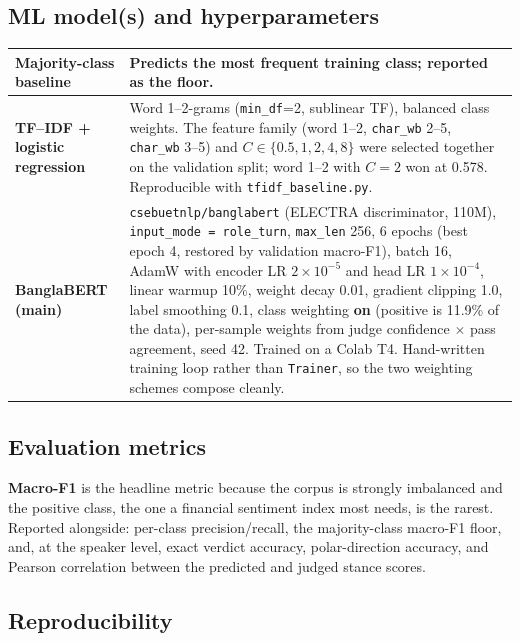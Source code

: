\documentclass[11pt,a4paper]{article}
\newcommand{\thd}[1]{\textbf{\sffamily\small #1}}          %
\begin{document}
\subsection{ML model(s) and hyperparameters}

\begin{tabularx}{\textwidth}{|L{4.0cm}|Y|}
\hline
\thd{Majority-class baseline} & Predicts the most frequent training class; reported as the floor. \\ \hline
\thd{TF--IDF + logistic regression} & Word 1--2-grams (\texttt{min\_df}=2, sublinear TF), balanced class weights. The feature family (word 1--2, \texttt{char\_wb} 2--5, \texttt{char\_wb} 3--5) and $C\in\{0.5,1,2,4,8\}$ were selected together on the validation split; word 1--2 with $C=2$ won at 0.578. Reproducible with \texttt{tfidf\_baseline.py}. \\ \hline
\thd{BanglaBERT (main)} & \texttt{csebuetnlp/banglabert} (ELECTRA discriminator, 110M), \texttt{input\_mode = role\_turn}, \texttt{max\_len} 256, 6 epochs (best epoch 4, restored by validation macro-F1), batch 16, AdamW with encoder LR $2\times10^{-5}$ and head LR $1\times10^{-4}$, linear warmup 10\%, weight decay 0.01, gradient clipping 1.0, label smoothing 0.1, class weighting \textbf{on} (positive is 11.9\% of the data), per-sample weights from judge confidence $\times$ pass agreement, seed 42. Trained on a Colab T4. Hand-written training loop rather than \texttt{Trainer}, so the two weighting schemes compose cleanly. \\ \hline
\end{tabularx}

\subsection{Evaluation metrics}

\textbf{Macro-F1} is the headline metric because the corpus is strongly imbalanced and the
positive class, the one a financial sentiment index most needs, is the rarest. Reported
alongside: per-class precision/recall, the majority-class macro-F1 floor, and, at the speaker
level, exact verdict accuracy, polar-direction accuracy, and Pearson correlation between the
predicted and judged stance scores.

\subsection{Reproducibility}
\end{document}
